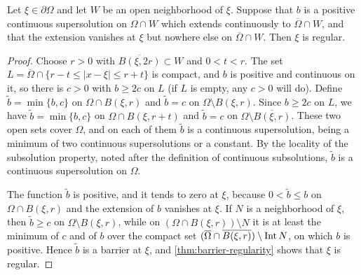 \begin{proposition}\label{prop:local-barrier}
Let $\xi\in\partial\Omega$ and let $W$ be an open neighborhood of $\xi$. Suppose that $b$ is a positive continuous supersolution on $\Omega\cap W$ which extends continuously to $\overline\Omega\cap W$, and that the extension vanishes at $\xi$ but nowhere else on $\overline\Omega\cap W$. Then $\xi$ is regular.
\end{proposition}
\begin{proof}
Choose $r>0$ with $\overline{B(\xi,2r)}\subset W$ and $0<t<r$. The set $L=\overline\Omega\cap\{r-t\leq|x-\xi|\leq r+t\}$ is compact, and $b$ is positive and continuous on it, so there is $c>0$ with $b\geq2c$ on $L$ (if $L$ is empty, any $c>0$ will do). Define $\tilde b=\min\{b,c\}$ on $\Omega\cap B(\xi,r)$ and $\tilde b=c$ on $\Omega\setminus B(\xi,r)$. Since $b\geq2c$ on $L$, we have $\tilde b=\min\{b,c\}$ on $\Omega\cap B(\xi,r+t)$ and $\tilde b=c$ on $\Omega\setminus\overline{B(\xi,r)}$. These two open sets cover $\Omega$, and on each of them $\tilde b$ is a continuous supersolution, being a minimum of two continuous supersolutions or a constant. By the locality of the subsolution property, noted after the definition of continuous subsolutions, $\tilde b$ is a continuous supersolution on $\Omega$.

The function $\tilde b$ is positive, and it tends to zero at $\xi$, because $0<\tilde b\leq b$ on $\Omega\cap B(\xi,r)$ and the extension of $b$ vanishes at $\xi$. If $N$ is a neighborhood of $\xi$, then $\tilde b\geq c$ on $\Omega\setminus B(\xi,r)$, while on $(\Omega\cap B(\xi,r))\setminus N$ it is at least the minimum of $c$ and of $b$ over the compact set $(\overline\Omega\cap\overline{B(\xi,r)})\setminus\operatorname{Int} N$, on which $b$ is positive. Hence $\tilde b$ is a barrier at $\xi$, and \cref{thm:barrier-regularity} shows that $\xi$ is regular.
\end{proof}

